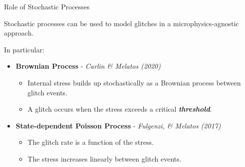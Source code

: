 \begin{frame}{Role of Stochastic Processes}

	Stochastic processes can be used to model glitches in a microphysics-agnostic approach.

	In particular:

	\vspace{0.2cm}
	{
	\setlength{\leftmargini}{1.5em}
	\setlength{\leftmarginii}{1.2em}
	\begin{itemize}
		\item \textbf{Brownian Process} \footnotesize - \textit{Carlin \& Melatos (2020)} \cite{CarlinMelatos2020}
		\normalsize
		\begin{itemize}
			\item Internal stress builds up stochastically as a Brownian process between glitch events.
			\vspace{0.2cm}
			\item A glitch occurs when the stress exceeds a critical \textbf{\textit{threshold}}.
		\end{itemize}
		\vspace{0.3cm}
		\item \textbf{State-dependent Poisson Process} \footnotesize - \textit{Fulgenzi, \& Melatos (2017)} \cite{FulgenziMelatosHughes2017}
		\normalsize
		\begin{itemize}
			\item The glitch rate is a function of the stress.
			\vspace{0.2cm}
			\item The stress increases linearly between glitch events.
		\end{itemize}
	\end{itemize}
	}
	
\end{frame}





